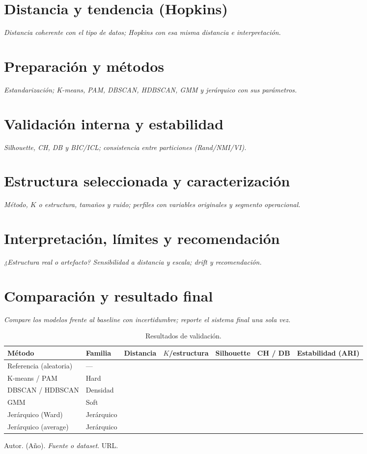 \documentclass[titlepage,11pt,letterpaper]{article}
\newcommand{\instruccion}[1]{\par\smallskip\noindent\textit{\color{gray!75!black}#1}\par\smallskip}
\begin{document}
\section{Distancia y tendencia (Hopkins)}
\instruccion{Distancia coherente con el tipo de datos; Hopkins con esa misma distancia e interpretación.}

\section{Preparación y métodos}
\instruccion{Estandarización; K-means, PAM, DBSCAN, HDBSCAN, GMM y jerárquico con sus parámetros.}

\section{Validación interna y estabilidad}
\instruccion{Silhouette, CH, DB y BIC/ICL; consistencia entre particiones (Rand/NMI/VI).}

\section{Estructura seleccionada y caracterización}
\instruccion{Método, $K$ o estructura, tamaños y ruido; perfiles con variables originales y segmento operacional.}

\section{Interpretación, límites y recomendación}
\instruccion{¿Estructura real o artefacto? Sensibilidad a distancia y escala; drift y recomendación.}

\section{Comparación y resultado final}
\instruccion{Compare los modelos frente al baseline con incertidumbre; reporte el sistema final una sola vez.}
\begin{table}[H]\centering\small
\caption{Resultados de validación.}
\begin{tabular}{lllllll}
\toprule
Método & Familia & Distancia & $K$/estructura & Silhouette & CH / DB & Estabilidad (ARI) \\
\midrule
Referencia (aleatoria) & --- & & & & & \\
K-means / PAM & Hard & & & & & \\
DBSCAN / HDBSCAN & Densidad & & & & & \\
GMM & Soft & & & & & \\
Jerárquico (Ward) & Jerárquico & & & & & \\
Jerárquico (average) & Jerárquico & & & & & \\
\bottomrule
\end{tabular}\end{table}
\begin{thebibliography}{9}
 Autor. (Año). \textit{Fuente o dataset}. URL.
\end{thebibliography}
\appendix
\end{document}
